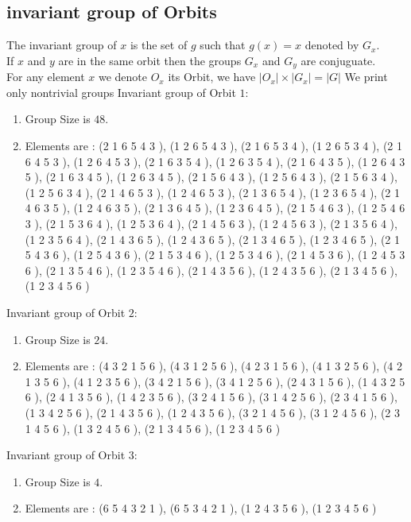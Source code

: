 \documentclass[12pt]{article}
\begin{document}
\subsection{invariant group of Orbits}
\noindent The invariant group of $x$ is the set of $g$ such that $g(x)=x$ denoted by $G_x$.\\
If $x$ and $y$ are in the same orbit then the groups $G_x$ and  $G_y$ are conjuguate.\\
For any element $x$ we denote $O_x$ its Orbit, we have $|O_x|\times |G_x|=|G|$
We print only nontrivial groups
Invariant group of Orbit $1$:
\begin{enumerate}
\item Group Size is $48$.
\item Elements are : (2 1 6 5 4 3  ), (1 2 6 5 4 3  ), (2 1 6 5 3 4  ), (1 2 6 5 3 4  ), (2 1 6 4 5 3  ), (1 2 6 4 5 3  ), (2 1 6 3 5 4  ), (1 2 6 3 5 4  ), (2 1 6 4 3 5  ), (1 2 6 4 3 5  ), (2 1 6 3 4 5  ), (1 2 6 3 4 5  ), (2 1 5 6 4 3  ), (1 2 5 6 4 3  ), (2 1 5 6 3 4  ), (1 2 5 6 3 4  ), (2 1 4 6 5 3  ), (1 2 4 6 5 3  ), (2 1 3 6 5 4  ), (1 2 3 6 5 4  ), (2 1 4 6 3 5  ), (1 2 4 6 3 5  ), (2 1 3 6 4 5  ), (1 2 3 6 4 5  ), (2 1 5 4 6 3  ), (1 2 5 4 6 3  ), (2 1 5 3 6 4  ), (1 2 5 3 6 4  ), (2 1 4 5 6 3  ), (1 2 4 5 6 3  ), (2 1 3 5 6 4  ), (1 2 3 5 6 4  ), (2 1 4 3 6 5  ), (1 2 4 3 6 5  ), (2 1 3 4 6 5  ), (1 2 3 4 6 5  ), (2 1 5 4 3 6  ), (1 2 5 4 3 6  ), (2 1 5 3 4 6  ), (1 2 5 3 4 6  ), (2 1 4 5 3 6  ), (1 2 4 5 3 6  ), (2 1 3 5 4 6  ), (1 2 3 5 4 6  ), (2 1 4 3 5 6  ), (1 2 4 3 5 6  ), (2 1 3 4 5 6  ), (1 2 3 4 5 6  )
\end{enumerate}
Invariant group of Orbit $2$:
\begin{enumerate}
\item Group Size is $24$.
\item Elements are : (4 3 2 1 5 6  ), (4 3 1 2 5 6  ), (4 2 3 1 5 6  ), (4 1 3 2 5 6  ), (4 2 1 3 5 6  ), (4 1 2 3 5 6  ), (3 4 2 1 5 6  ), (3 4 1 2 5 6  ), (2 4 3 1 5 6  ), (1 4 3 2 5 6  ), (2 4 1 3 5 6  ), (1 4 2 3 5 6  ), (3 2 4 1 5 6  ), (3 1 4 2 5 6  ), (2 3 4 1 5 6  ), (1 3 4 2 5 6  ), (2 1 4 3 5 6  ), (1 2 4 3 5 6  ), (3 2 1 4 5 6  ), (3 1 2 4 5 6  ), (2 3 1 4 5 6  ), (1 3 2 4 5 6  ), (2 1 3 4 5 6  ), (1 2 3 4 5 6  )
\end{enumerate}
Invariant group of Orbit $3$:
\begin{enumerate}
\item Group Size is $4$.
\item Elements are : (6 5 4 3 2 1  ), (6 5 3 4 2 1  ), (1 2 4 3 5 6  ), (1 2 3 4 5 6  )
\end{enumerate}
\end{document}
